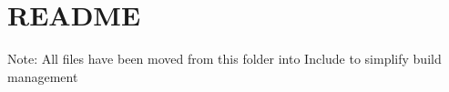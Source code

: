 \chapter{README}
\hypertarget{md__face___access__inferencing_2src_2edge-impulse-sdk_2_c_m_s_i_s_2_d_s_p_2_private_include_2_r_e_a_d_m_e}{}\label{md__face___access__inferencing_2src_2edge-impulse-sdk_2_c_m_s_i_s_2_d_s_p_2_private_include_2_r_e_a_d_m_e}
Note\+: All files have been moved from this folder into Include to simplify build management 